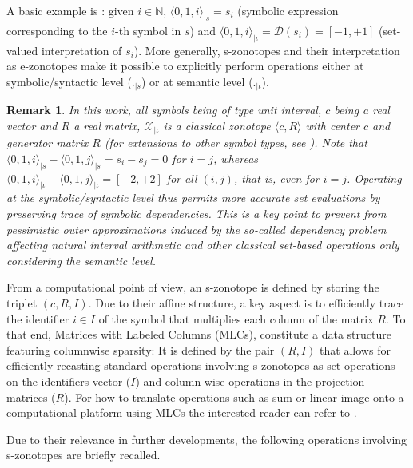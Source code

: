 \documentclass[journal]{IEEEtran}
\newtheorem{myremark}{Remark}
\begin{document}
A basic example is : given $i \in \mathbb{N}$, $\langle 0,1,i\rangle _{|s} = s_i$ (symbolic expression corresponding to the $i$-th symbol in $s$) and $\langle 0,1,i\rangle _{|\iota} = \mathcal{D}(s_i) = [-1,+1]$ (set-valued interpretation of $s_i$). More generally, s-zonotopes  and their interpretation as e-zonotopes make it possible to explicitly perform operations either at symbolic/syntactic level ($._{|s}$) or at semantic level ($._{|\iota}$). 

\begin{myremark}
In this work, all symbols being of type unit interval, $c$ being a real vector and $R$ a real matrix, $\mathcal{X}_{|\iota}$ is a classical zonotope $\langle c,R \rangle$ with center $c$ and generator matrix $R$ (for extensions to other symbol types, see \cite{combastel2020functional}). Note that $\langle 0,1,i\rangle_{|s}-\langle 0,1,j\rangle_{|s} = s_i - s_j = 0$ for $i=j$, whereas $\langle 0,1,i\rangle_{|\iota}-\langle 0,1,j\rangle_{|\iota} = [-2,+2]$ for all $(i,j)$, that is, even for $i=j$. Operating at the symbolic/syntactic level thus permits more accurate set evaluations by preserving trace of symbolic dependencies. This is a key point to prevent from pessimistic outer approximations induced by the so-called dependency problem \cite{moore2009introduction} affecting natural interval arithmetic and other classical set-based operations only considering the semantic level.
\end{myremark}

From a computational point of view, an s-zonotope is defined by storing the triplet $(c,R,I)$. Due to their affine structure, a key aspect is to efficiently trace  the identifier $i \in I$ of the symbol that multiplies each column of the matrix $R$.  To that end, Matrices with Labeled Columns (MLCs), constitute a data structure featuring columnwise sparsity: It is defined by the pair $(R,I)$ that allows for efficiently recasting standard operations involving s-zonotopes as set-operations on the identifiers vector ($I$) and column-wise operations in the projection matrices ($R$). For how to translate  operations such as sum or linear image onto a computational platform using MLCs the interested reader can refer to \cite{combastel2020distributed}.

Due to their relevance in further developments, the following operations involving s-zonotopes are briefly recalled.
\end{document}
